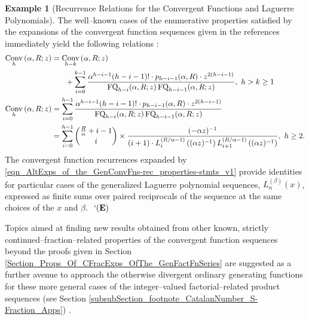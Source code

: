 \documentclass[12pt,reqno]{article}
\numberwithin{sfootnote}{section}
\numberwithin{equation}{section}
\theoremstyle{DefaultTheoremStyle}
\theoremstyle{definition}
\newtheorem{example}[theorem]{Example}
\newcommand{\eolqedsymbol}[1]{{\hrulefill\ensuremath{\ #1}}}
\renewcommand{\eolqedsymbol}[1]{{\mboxfill{ }\ensuremath{\ #1}}}
\newcommand{\ExampleQEDSymbol}{`(\text{\rm{\bf E}})}
\newcommand{\ExampleQED}{\eolqedsymbol{\ExampleQEDSymbol}}
\newcommand{\cf}[0]{cf.\ }
\newcommand{\ConvGF}[4]{\ensuremath{\Conv_{#1}\left(#2, #3; #4\right)}}
\DeclareMathOperator{\FQ}{FQ}
\DeclareMathOperator{\Conv}{Conv}
\begin{document}
\begin{example}[Recurrence Relations for the Convergent Functions and Laguerre Polynomials] 
The well--known cases of the enumerative properties satisfied by the 
expansions of the convergent function sequences given in the references 
immediately yield the following relations 
\citep[\S 3]{FLAJOLET80B} \citep[\S 1.12(ii)]{NISTHB}: 
\begin{align} 
\notag 
\ConvGF{h}{\alpha}{R}{z} & = 
     \ConvGF{h-k}{\alpha}{R}{z} \\ 
\notag 
     & \phantom{= \quad } + 
     \sum_{i=0}^{k-1} 
     \frac{\alpha^{h-i-1} (h-i-1)! \cdot p_{h-i-1}(\alpha, R) \cdot 
     z^{2(h-i-1)}}{ 
     \FQ_{h-i}(\alpha, R; z) \FQ_{h-i-1}(\alpha, R; z)},\ 
     h > k \geq 1 \\ 
\label{eqn_AltExps_of_the_GenConvFns-rec_properties-stmts_v1} 
\ConvGF{h}{\alpha}{R}{z} & = 
     \sum_{i=0}^{h-1} 
     \frac{\alpha^{h-i-1} (h-i-1)! \cdot p_{h-i-1}(\alpha, R) \cdot 
     z^{2(h-i-1)}}{ 
     \FQ_{h-i}(\alpha, R; z) \FQ_{h-i-1}(\alpha, R; z)} \\ 
\notag 
     & = 
     \sum_{i=0}^{h-1} \binom{\frac{R}{\alpha}+i-1}{i} \times 
     \frac{(-\alpha z)^{-1}}{(i+1) \cdot 
     L_{i}^{(R / \alpha - 1)}\left((\alpha z)^{-1}\right) 
     L_{i+1}^{(R / \alpha - 1)}\left((\alpha z)^{-1}\right)},\ 
     h \geq 2. 
\end{align} 
The convergent function recurrences expanded by 
\eqref{eqn_AltExps_of_the_GenConvFns-rec_properties-stmts_v1} 
provide identities for particular cases of the generalized 
Laguerre polynomial sequences, $L_n^{(\beta)}(x)$, 
expressed as finite sums over paired reciprocals of the 
sequence at the same choices of the $x$ and $\beta$. 
\ExampleQED 
\end{example} 

Topics aimed at finding new results obtained from other known, strictly 
continued--fraction--related properties of the 
convergent function sequences beyond the proofs given in 
Section \ref{Section_Props_Of_CFracExps_OfThe_GenFactFnSeries} 
are suggested as a further avenue to approach the 
otherwise divergent ordinary generating functions for these 
more general cases of the integer--valued 
factorial--related product sequences 
(see Section \ref{subsubSection_footnote_CatalanNumber_S-Fraction_Apps}) 
\citep[\cf \S 10]{HARDYWRIGHTNUMT}. 
\end{document}
